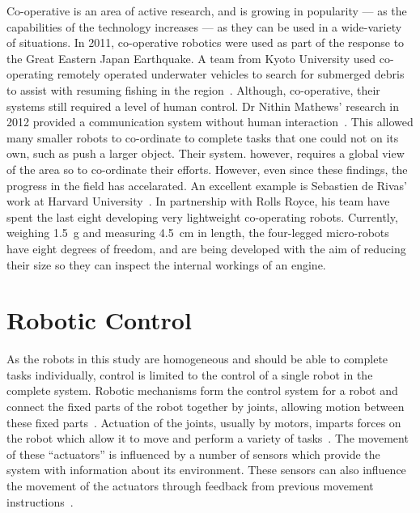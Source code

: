 Co-operative is an area of active research, and is growing in popularity --- as the
capabilities of the technology increases --- as they can be used in a wide-variety of
situations. In 2011, co-operative robotics were used as part of the
response to the Great Eastern Japan Earthquake. A team from Kyoto University
used co-operating remotely operated underwater vehicles to search for submerged
debris to assist with resuming fishing in the region~\cite{matsuno2014utilization}.
Although, co-operative, their systems still required a level of human control.
Dr Nithin Mathews' research in 2012 provided a communication system without
human interaction~\cite{mathews2012spatially}. This allowed many smaller robots
to co-ordinate to complete tasks that one could not on its own, such as push a
larger object. Their system. however, requires a global view of the area so to 
co-ordinate their efforts. However, even since these findings, the progress
in the field has accelarated. An excellent example is Sebastien de Rivas' work at
Harvard University~\cite{rollsroyceSWARM}. In partnership with Rolls Royce, his
team have spent the last eight developing very lightweight co-operating robots.
Currently, weighing \SI{1.5}{\g} and measuring \SI{4.5}{\cm} in length, the
four-legged micro-robots have eight degrees of freedom, and are being developed with
the aim of reducing their size so they can inspect the internal workings of an engine.


\section{Robotic Control} \label{litreview/robotics/control}  
As the robots in this study are homogeneous and should be able to complete 
tasks individually, control is limited to the control of a single robot in the 
complete system. Robotic mechanisms form the control system for a robot and 
connect the fixed parts of the robot together by joints, allowing motion between 
these fixed parts~\cite{lynch2017modern}. Actuation of the joints, usually 
by motors, imparts forces on the robot which allow it to move and perform a 
variety of tasks~\cite{lynch2017modern}. The movement of these ``actuators'' 
is influenced by a number of sensors which provide the system with information 
about its environment. These sensors can also influence the movement of the 
actuators through feedback from previous movement instructions~\cite{lynch2017modern}.    

